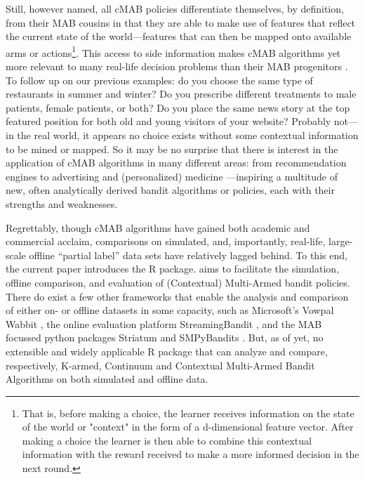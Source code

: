 \documentclass{jss}\usepackage[]{graphicx}\usepackage[]{color}
\begin{document}
Still, however named, all cMAB policies differentiate themselves, by definition, from their MAB cousins in that they are able to make use of features that reflect the current state of the world---features that can then be mapped onto available arms or actions\footnote{That is, before making a choice, the learner receives information on the state of the world or "context" in the form of a d-dimensional feature vector. After making a choice the learner is then able to combine this contextual information with the reward received to make a more informed decision in the next round.}. This access to side information makes cMAB algorithms yet more relevant to many real-life decision problems than their MAB progenitors \citep{Langford2008}. To follow up on our previous examples: do you choose the same  type of restaurants in summer and winter? Do you prescribe different treatments to male patients, female patients, or both? Do you place the same news story at the top featured position for both old and young visitors of your website? Probably not---in the real world, it appears no choice exists without some contextual information to be mined or mapped. So it may be no surprise that there is interest in the application of cMAB algorithms in many different areas: from recommendation engines \citep{Lai1985} to advertising \citep{Tang2013} and (personalized) medicine \cite{Tewari2017}---inspiring a multitude of new, often analytically derived bandit algorithms or policies, each with their strengths and weaknesses.

Regrettably, though cMAB algorithms have gained both academic and commercial acclaim, comparisons on simulated, and, importantly, real-life, large-scale offline \textquotedblleft{}partial label\textquotedblright{} data sets have relatively lagged behind. To this end, the current paper introduces the  R package.  aims to facilitate the simulation, offline comparison, and evaluation of (Contextual) Multi-Armed bandit policies. There do exist a few other frameworks that enable the analysis and comparison of either on- or offline datasets in some capacity, such as Microsoft's Vowpal Wabbit \citep{Langford2007}, the online evaluation platform StreamingBandit \citep{Kaptein2016}, and the MAB focussed python packages Striatum \citep{2018} and SMPyBandits \citep{SMPyBandits}. But, as of yet, no extensible and widely applicable R \citep{RCore} package that can analyze and compare, respectively, K-armed, Continuum and Contextual Multi-Armed Bandit Algorithms on both simulated and offline data.
\end{document}
